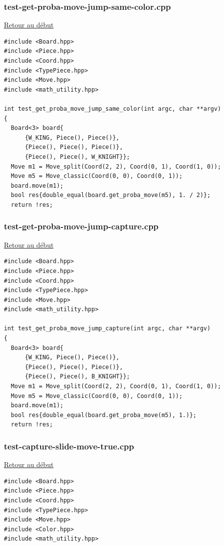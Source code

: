 {\begin{frame}[fragile]
\begin{verbatim}
\end{verbatim}
\end{frame}

\begin{frame}[fragile]
\label{testgetprobamovejumpsamecolor.cpp}
\frametitle{test-get-proba-move-jump-same-color.cpp}
\hyperlink{conclusion}{Retour au début}\newline
\begin{verbatim}
#include <Board.hpp>
#include <Piece.hpp>
#include <Coord.hpp>
#include <TypePiece.hpp>
#include <Move.hpp>
#include <math_utility.hpp>

int test_get_proba_move_jump_same_color(int argc, char **argv)
{
  Board<3> board{
      {W_KING, Piece(), Piece()},
      {Piece(), Piece(), Piece()},
      {Piece(), Piece(), W_KNIGHT}};
  Move m1 = Move_split(Coord(2, 2), Coord(0, 1), Coord(1, 0));
  Move m5 = Move_classic(Coord(0, 0), Coord(0, 1));
  board.move(m1);
  bool res{double_equal(board.get_proba_move(m5), 1. / 2)};
  return !res;

\end{verbatim}
\end{frame}

\begin{frame}[fragile]
\label{testgetprobamovejumpcapture.cpp}
\frametitle{test-get-proba-move-jump-capture.cpp}
\hyperlink{conclusion}{Retour au début}\newline
\begin{verbatim}
#include <Board.hpp>
#include <Piece.hpp>
#include <Coord.hpp>
#include <TypePiece.hpp>
#include <Move.hpp>
#include <math_utility.hpp>

int test_get_proba_move_jump_capture(int argc, char **argv)
{
  Board<3> board{
      {W_KING, Piece(), Piece()},
      {Piece(), Piece(), Piece()},
      {Piece(), Piece(), B_KNIGHT}};
  Move m1 = Move_split(Coord(2, 2), Coord(0, 1), Coord(1, 0));
  Move m5 = Move_classic(Coord(0, 0), Coord(0, 1));
  board.move(m1);
  bool res{double_equal(board.get_proba_move(m5), 1.)};
  return !res;

\end{verbatim}
\end{frame}

\begin{frame}[fragile]
\label{testcaptureslidemovetrue.cpp}
\frametitle{test-capture-slide-move-true.cpp}
\hyperlink{conclusion}{Retour au début}\newline
\begin{verbatim}
#include <Board.hpp>
#include <Piece.hpp>
#include <Coord.hpp>
#include <TypePiece.hpp>
#include <Move.hpp>
#include <Color.hpp>
#include <math_utility.hpp>


\end{verbatim}
\end{frame}}
